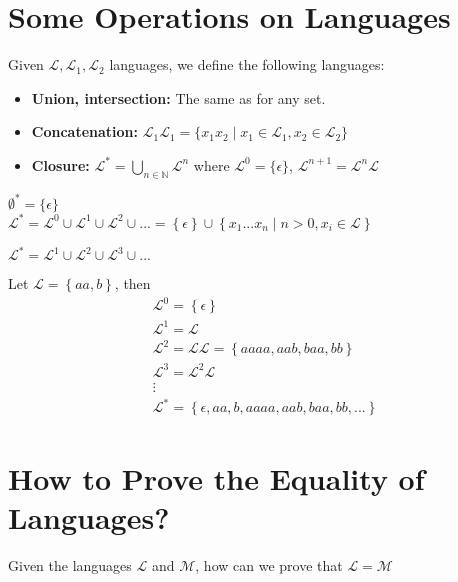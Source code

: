 \section{Some Operations on Languages} %
\label{sec:some_operations_on_languages}
\begin{Def}
    Given $\mathcal{L}, \mathcal{L}_1, \mathcal{L}_2$ languages, we define the following languages:
\end{Def}
\begin{itemize}
\item \textbf{Union, intersection:} The same as for any set.\\
\item \textbf{Concatenation:} $\mathcal{L}_1 \mathcal{L}_1 = \{x_1x_2 \mid x_1 \in \mathcal{L}_1, x_2 \in \mathcal{L}_2\}$\\
\item \textbf{Closure:} $\mathcal{L}^* = \bigcup_{n \in \mathbb{N}} \mathcal{L}^n$ where $\mathcal{L}^0 = \{\epsilon\}$, $\mathcal{L}^{n+1} = \mathcal{L}^n \mathcal{L}$
\end{itemize}
\begin{Rem}
        $\emptyset^* = \{\epsilon\}$\\
        $\mathcal{L}^* = \mathcal{L}^0 \cup \mathcal{L}^1 \cup \mathcal{L}^2 \cup ... = \left\{ \epsilon \right\} \cup \left\{ x_1 ... x_n \mid n > 0, x_i \in \mathcal{L} \right\}$
\end{Rem}
\begin{Not}
    $\mathcal{L}^* = \mathcal{L}^1 \cup \mathcal{L}^2 \cup \mathcal{L}^3 \cup ...$
\end{Not}
\begin{Ex}
    Let $\mathcal{L} = \left\{ aa, b \right\}$, then
    \begin{align*}
        &\mathcal{L}^0 = \left\{ \epsilon \right\}\\
        &\mathcal{L}^1 = \mathcal{L}\\
        &\mathcal{L}^2 = \mathcal{L}\mathcal{L} = \left\{ aaaa, aab, baa, bb \right\}\\
        &\mathcal{L}^3 = \mathcal{L}^2 \mathcal{L}\\
        &\vdots\\
        &\mathcal{L}^* = \left\{ \epsilon, aa, b, aaaa, aab, baa, bb, ... \right\}
    \end{align*}
\end{Ex}

\section{How to Prove the Equality of Languages?} %
\label{sec:how_to_prove_the_equality_of_languages_}
Given the languages $\mathcal{L}$ and $\mathcal{M}$, how can we prove that $\mathcal{L} = \mathcal{M}$\\
\bigskip

